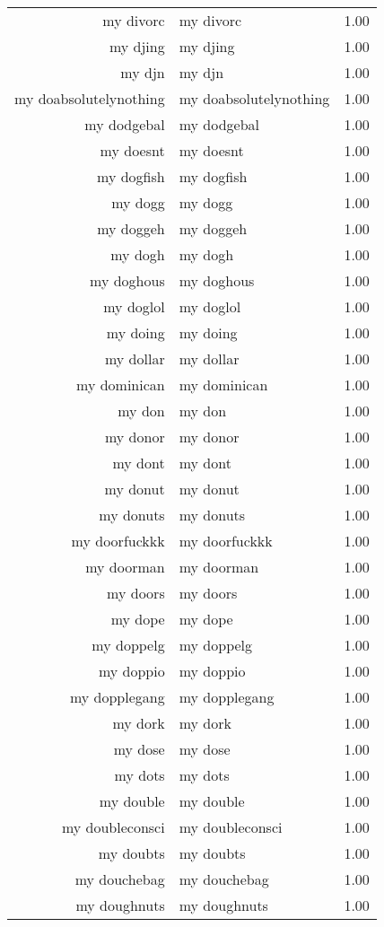 \begin{table}[ht]
\begin{tabular}{rlr}
  my divorc & my divorc & 1.00 \\ 
  my djing & my djing & 1.00 \\ 
  my djn & my djn & 1.00 \\ 
  my doabsolutelynothing & my doabsolutelynothing & 1.00 \\ 
  my dodgebal & my dodgebal & 1.00 \\ 
  my doesnt & my doesnt & 1.00 \\ 
  my dogfish & my dogfish & 1.00 \\ 
  my dogg & my dogg & 1.00 \\ 
  my doggeh & my doggeh & 1.00 \\ 
  my dogh & my dogh & 1.00 \\ 
  my doghous & my doghous & 1.00 \\ 
  my doglol & my doglol & 1.00 \\ 
  my doing & my doing & 1.00 \\ 
  my dollar & my dollar & 1.00 \\ 
  my dominican & my dominican & 1.00 \\ 
  my don & my don & 1.00 \\ 
  my donor & my donor & 1.00 \\ 
  my dont & my dont & 1.00 \\ 
  my donut & my donut & 1.00 \\ 
  my donuts & my donuts & 1.00 \\ 
  my doorfuckkk & my doorfuckkk & 1.00 \\ 
  my doorman & my doorman & 1.00 \\ 
  my doors & my doors & 1.00 \\ 
  my dope & my dope & 1.00 \\ 
  my doppelg & my doppelg & 1.00 \\ 
  my doppio & my doppio & 1.00 \\ 
  my dopplegang & my dopplegang & 1.00 \\ 
  my dork & my dork & 1.00 \\ 
  my dose & my dose & 1.00 \\ 
  my dots & my dots & 1.00 \\ 
  my double & my double & 1.00 \\ 
  my doubleconsci & my doubleconsci & 1.00 \\ 
  my doubts & my doubts & 1.00 \\ 
  my douchebag & my douchebag & 1.00 \\ 
  my doughnuts & my doughnuts & 1.00 \\ 

\end{tabular}
\end{table}
